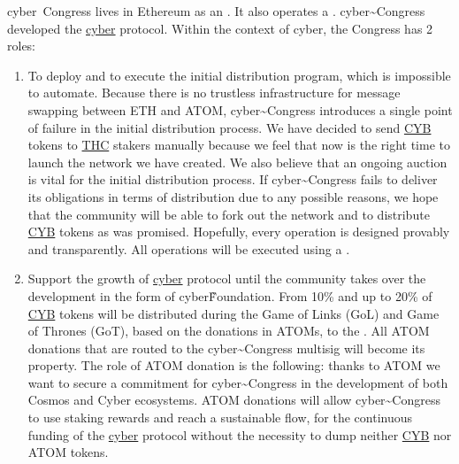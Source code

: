 \documentclass[8pt,oneside]{amsart}
\newcommand{\linkgreen}[2]{\href{#1}{\color{green}{#2}}}
\begin{document}
cyber~Congress lives in Ethereum as an \linkgreen{https://mainnet.aragon.org/#/cybercongress/0x4feb2bcc5907e7779130c093eef8fb44502c1330/}{Aragon DAO}. It also operates a \linkgreen{https://cyber.page/network/cyber/contract/cyber1latzme6xf6s8tsrymuu6laf2ks2humqvdq39v8}{2-of-3 multisig in Cyber network}. cyber\~{}Congress developed the {\hyperref[cyber]{cyber}} protocol. Within the context of cyber, the Congress has 2 roles:
\begin{enumerate}
 \item To deploy and to execute the initial distribution program, which is impossible to automate. Because there is no trustless infrastructure for message swapping between ETH and ATOM, cyber\~{}Congress introduces a single point of failure in the initial distribution process. We have decided to send {\hyperref[cyb]{CYB}} tokens to {\hyperref[thc]{THC}} stakers manually because we feel that now is the right time to launch the network we have created. We also believe that an ongoing auction is vital for the initial distribution process. If cyber\~{}Congress fails to deliver its obligations in terms of distribution due to any possible reasons, we hope that the community will be able to fork out the network and to distribute {\hyperref[cyb]{CYB}} tokens as was promised. Hopefully, every operation is designed provably and transparently. All operations will be executed using a \linkgreen{
https://cyber.page/network/cyber/contract/cyber147drnke9676972jr3anklkj7pzgwjw47cp2u7j}{special purpose 2-of-3 multisig account in Cyber network}.
 \item Support the growth of {\hyperref[cyber]{cyber}} protocol until the community takes over the development in the form of cyber\~Foundation. From 10\% and up to 20\% of {\hyperref[cyb]{CYB}} tokens will be distributed  during the Game of Links (GoL) and Game of Thrones (GoT), based on the donations in ATOMs, to the \linkgreen{
https://www.mintscan.io/account/cosmos1latzme6xf6s8tsrymuu6laf2ks2humqv2tkd9a}{cyber\~{}Congress Cosmos 2-of-3 multisig}. All ATOM donations that are routed to the cyber\~{}Congress multisig will become its property. The role of ATOM donation is the following: thanks to ATOM we want to secure a commitment for cyber\~{}Congress in the development of both Cosmos and Cyber ecosystems. ATOM donations will allow cyber\~{}Congress to use staking rewards and reach a sustainable flow, for the continuous funding of the {\hyperref[cyber]{cyber}} protocol without the necessity to dump neither {\hyperref[cyb]{CYB}} nor ATOM tokens.
\end{enumerate}
\end{document}
